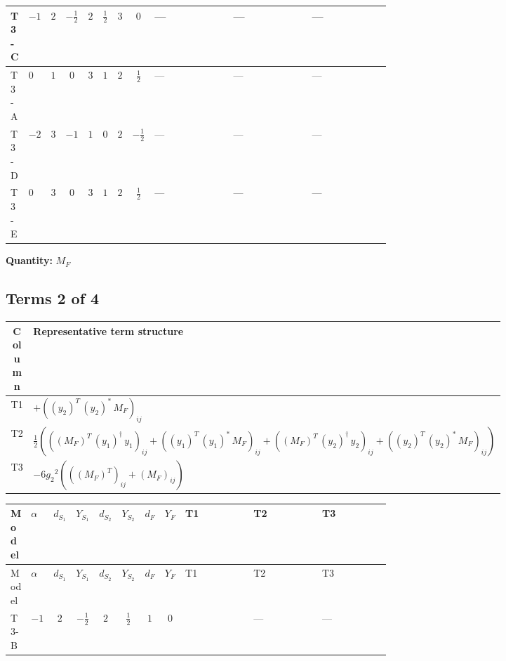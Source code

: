 \documentclass[8pt]{article}
\begin{document}
\begin{landscape}
\begin{longtable}{@{}llcccccc >{\raggedright\arraybackslash}p{0.21\linewidth} >{\raggedright\arraybackslash}p{0.21\linewidth} >{\raggedright\arraybackslash}p{0.21\linewidth}@{}}
\midrule
T3-C & $-1$ & $2$ & $-\frac{1}{2}$ & $2$ & $\frac{1}{2}$ & $3$ & $0$ & --- & --- & --- \\
\midrule
T3-A & $0$ & $1$ & $0$ & $3$ & $1$ & $2$ & $\frac{1}{2}$ & --- & --- & --- \\
\midrule
T3-D & $-2$ & $3$ & $-1$ & $1$ & $0$ & $2$ & $-\frac{1}{2}$ & --- & --- & --- \\
\midrule
T3-E & $0$ & $3$ & $0$ & $3$ & $1$ & $2$ & $\frac{1}{2}$ & --- & --- & --- \\
\midrule
\bottomrule
\end{longtable}
\clearpage
\noindent\textbf{Quantity: }$M_F$\par\smallskip
\subsection*{Terms 2 of 4}
\begin{center}
\begin{tabular}{@{}c >{\raggedright\arraybackslash}p{0.82\linewidth}@{}}
\toprule
Column & Representative term structure \\
\midrule
T1 & \(\displaystyle +\left(\left({y_2}\right)^{T}\,\left({y_2}\right)^{*}\,{M_F}\right)_{ij}\) \\
\midrule
T2 & \(\displaystyle \frac{1}{2} (\left(\left({M_F}\right)^{T}\,\left({y_1}\right)^{\dagger}\,{y_1}\right)_{ij}+\left(\left({y_1}\right)^{T}\,\left({y_1}\right)^{*}\,{M_F}\right)_{ij}+\left(\left({M_F}\right)^{T}\,\left({y_2}\right)^{\dagger}\,{y_2}\right)_{ij}+\left(\left({y_2}\right)^{T}\,\left({y_2}\right)^{*}\,{M_F}\right)_{ij})\) \\
\midrule
T3 & \(\displaystyle -6 {g_2}^2 (\left(\left({M_F}\right)^{T}\right)_{ij}+\left({M_F}\right)_{ij})\) \\
\midrule
\bottomrule
\end{tabular}
\end{center}
\smallskip
\tiny
\begin{longtable}{@{}llcccccc >{\raggedright\arraybackslash}p{0.21\linewidth} >{\raggedright\arraybackslash}p{0.21\linewidth} >{\raggedright\arraybackslash}p{0.21\linewidth}@{}}
\toprule
Model & $\alpha$ & $d_{S_1}$ & $Y_{S_1}$ & $d_{S_2}$ & $Y_{S_2}$ & $d_F$ & $Y_F$ & T1 & T2 & T3 \\
\midrule
\endfirsthead
\toprule
Model & $\alpha$ & $d_{S_1}$ & $Y_{S_1}$ & $d_{S_2}$ & $Y_{S_2}$ & $d_F$ & $Y_F$ & T1 & T2 & T3 \\
\midrule
\endhead
T3-B & $-1$ & $2$ & $-\frac{1}{2}$ & $2$ & $\frac{1}{2}$ & $1$ & $0$ & \scriptsize\adjustbox{max width=\linewidth}{$\begin{gathered} +\left(\left({y_2}\right)^{T}\,\left({y_2}\right)^{*}\,{M_F}\right)_{ij}\end{gathered}$} & --- & --- \\

\end{longtable}
\end{landscape}
\end{document}
